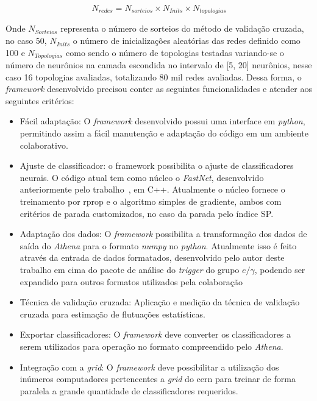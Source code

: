 \begin{equation}
N_{redes}=N_{sorteios}\times N_{Inits}\times N_{topologias} 
\label{eq:total_n_redes}
\end{equation}

Onde $N_{Sorteios}$ representa o número de sorteios do método de validação cruzada, no caso 50, $N_{Inits}$ o número de inicializações aleatórias
das redes definido como 100 e $N_{Topologias}$ como sendo o número de topologias testadas variando-se o número de neurônios na camada
escondida no intervalo de [5, 20] neurônios, nesse caso 16 topologias avaliadas, totalizando 80 mil redes avaliadas. Dessa forma, o \textit{framework} desenvolvido
precisou conter as seguintes funcionalidades e atender aos seguintes critérios: 

\begin{itemize}

\item Fácil adaptação: O \textit{framework} desenvolvido possui uma interface em \textit{python}, permitindo assim a fácil manutenção e adaptação do código em um
ambiente colaborativo.

\item Ajuste de classificador: o framework possibilita o ajuste de classificadores neurais. O código atual tem como núcleo o \textit{FastNet}, desenvolvido anteriormente pelo 
trabalho~\cite{tese_torres}, em C++. Atualmente o núcleo fornece o treinamento por \gls{rprop} \cite{rprop} e o algoritmo simples de gradiente, ambos
com critérios de parada customizados, no caso da parada pelo índice SP.

\item Adaptação dos dados: O \textit{framework} possibilita a transformação dos dados de saída do \textit{Athena} para o formato \textit{numpy} no \textit{python}. Atualmente isso é feito através da 
entrada de dados formatados, desenvolvido pelo autor deste trabalho em cima do pacote de análise do \textit{trigger} do grupo $e/\gamma$, podendo ser expandido para outros formatos
utilizados pela colaboração

\item Técnica de validação cruzada: Aplicação e medição da técnica de validação cruzada para estimação de flutuações estatísticas.

\item Exportar classificadores: O \textit{framework} deve converter os classificadores a serem utilizados para operação no formato compreendido pelo \textit{Athena}.


\item Integração com a \textit{grid}: O \textit{framework} deve possibilitar a utilização dos inúmeros computadores pertencentes a \textit{grid} do \gls{cern} para treinar de forma
paralela a grande quantidade de classificadores requeridos.

\end{itemize}

